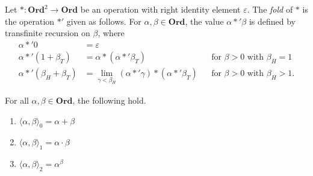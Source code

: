 \documentclass[10pt,a4paper]{amsart}
\newcommand{\op}[2]{\langle#1, #2\rangle}
\newcommand{\ord}{\mathbf{Ord}}
\begin{document}
\begin{definition}\label{def:fold}
    Let $* : \ord^2 \to \ord$ be an operation with right identity element $\varepsilon$. The \emph{fold} of $*$ is the operation $*'$ given as follows. For $\alpha, \beta \in \ord$, the value $\alpha *' \beta$ is defined by transfinite recursion on $\beta$, where
    \begin{align*}
        \alpha *' 0 &= \varepsilon\\
        \alpha *' (1+\beta_T) &= \alpha * (\alpha *' \beta_T) &&\text{for }\beta > 0\text{ with }\beta_H = 1\\
        \alpha *' (\beta_H + \beta_T) &= \lim_{\gamma<\beta_H} (\alpha *' \gamma) * (\alpha *' \beta_T) && \text{for }\beta > 0\text{ with }\beta_H > 1.
    \end{align*}
\end{definition}

\begin{theorem}
    For all $\alpha, \beta \in \ord$, the following hold.
    \begin{enumerate}
        \item[\textnormal{(i)}] $\op\alpha\beta_0 = \alpha + \beta$
        \item[\textnormal{(ii)}] $\op\alpha\beta_1 = \alpha \cdot \beta$
        \item[\textnormal{(iii)}] $\op\alpha\beta_2 = \alpha^\beta$
    \end{enumerate}
\end{theorem}
\end{document}
